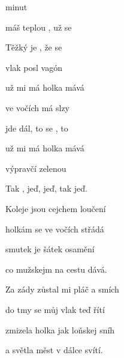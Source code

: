 

\zs
{}  minut  

máš teplou , už se 

Těžký je , že se  

vlak posl vagón 
\ks

\zr
{} už mi má holka mává

ve vočích má slzy 

 jde dál, to se ,  to 

 už mi má holka mává

výpravčí zelenou 

Tak , jeď, jeď, tak jeď.
\kr

\zs
Koleje jsou cejchem loučení

holkám se ve vočích střádá

smutek je šátek osamění

co mužskejm na cestu dává.
\ks

\zr  \kr

\zs
Za zády zůstal mi pláč a smích

do tmy se můj vlak teď řítí

zmizela holka jak loňskej sníh

a světla měst v dálce svítí.
\ks

\zr  \kr

\kp





